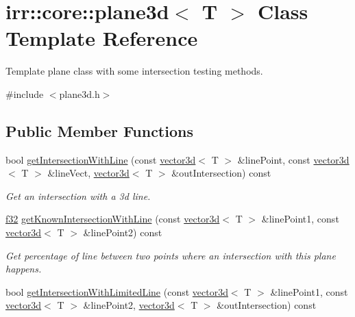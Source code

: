 \hypertarget{classirr_1_1core_1_1plane3d}{}\section{irr\+:\+:core\+:\+:plane3d$<$ T $>$ Class Template Reference}
\label{classirr_1_1core_1_1plane3d}


Template plane class with some intersection testing methods.  




{\ttfamily \#include $<$plane3d.\+h$>$}

\subsection*{Public Member Functions}
\begin{DoxyCompactItemize}
\item 
bool \hyperlink{classirr_1_1core_1_1plane3d_ae3fb02f09788ead8b36523891fbd1288}{get\+Intersection\+With\+Line} (const \hyperlink{classirr_1_1core_1_1vector3d}{vector3d}$<$ T $>$ \&line\+Point, const \hyperlink{classirr_1_1core_1_1vector3d}{vector3d}$<$ T $>$ \&line\+Vect, \hyperlink{classirr_1_1core_1_1vector3d}{vector3d}$<$ T $>$ \&out\+Intersection) const
\begin{DoxyCompactList}\small\item\em Get an intersection with a 3d line. \end{DoxyCompactList}\item 
\hyperlink{namespaceirr_a0277be98d67dc26ff93b1a6a1d086b07}{f32} \hyperlink{classirr_1_1core_1_1plane3d_a5fcd4852c2634172862324340558c634}{get\+Known\+Intersection\+With\+Line} (const \hyperlink{classirr_1_1core_1_1vector3d}{vector3d}$<$ T $>$ \&line\+Point1, const \hyperlink{classirr_1_1core_1_1vector3d}{vector3d}$<$ T $>$ \&line\+Point2) const
\begin{DoxyCompactList}\small\item\em Get percentage of line between two points where an intersection with this plane happens. \end{DoxyCompactList}\item 
bool \hyperlink{classirr_1_1core_1_1plane3d_a6bec8dcaa0eeb9f7bdd5b727f3d3561d}{get\+Intersection\+With\+Limited\+Line} (const \hyperlink{classirr_1_1core_1_1vector3d}{vector3d}$<$ T $>$ \&line\+Point1, const \hyperlink{classirr_1_1core_1_1vector3d}{vector3d}$<$ T $>$ \&line\+Point2, \hyperlink{classirr_1_1core_1_1vector3d}{vector3d}$<$ T $>$ \&out\+Intersection) const

\end{DoxyCompactItemize}
